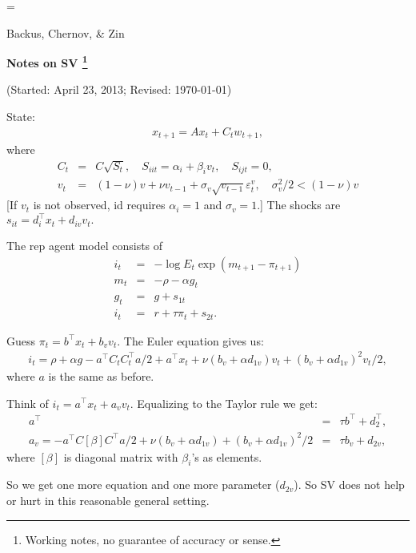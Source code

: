 \documentclass[11pt]{article}
\begin{document}
\parskip=\bigskipamount
\parindent=0.0in
\thispagestyle{empty}
\begin{flushright} Backus, Chernov, \& Zin \end{flushright}

\bigskip
\centerline{\Large \bf Notes on SV%
\footnote{Working notes, no guarantee of accuracy or sense.}}
\centerline{(Started: April 23, 2013; Revised: \today)}


State:
\begin{eqnarray*}
    x_{t+1} =  A  x_t + C_t w_{t+1} ,
    \label{eq:state-dynamics}
\end{eqnarray*}
where
\begin{eqnarray*}
   C_t &=& C \sqrt{S_t}, \quad S_{ii t} = \alpha_i+\beta_i v_t, \quad S_{ijt}=0, \\
       v_t &=& (1-\nu) v + \nu v_{t-1} + \sigma_v \sqrt{v_{t-1}} \varepsilon_t^v, \quad \sigma_v^2/2<(1-\nu)v
\end{eqnarray*}
[If $v_t$ is not observed, id requires $\alpha_i=1$ and $\sigma_v=1.$] The shocks are
$s_{it}=d_i^{\top}x_t+d_{iv}v_t.$

The rep agent model consists of
\begin{eqnarray*}
    i_t &=& %
            - \log E_t \exp(m_{t+1}-\pi_{t+1})
        \label{eq:macrofin-euler} \\
    m_t &=& - \rho - \alpha g_t \nonumber \\
    g_t &=& g + s_{1t}   \nonumber \\
    i_t &=& r + \tau \pi_t + s_{2t} .
        \label{eq:macrofin-taylor}
\end{eqnarray*}

Guess $\pi_t=b^{\top}x_t + b_v v_t.$ The Euler equation gives us:
\begin{eqnarray*}
    i_t = \rho + \alpha g - a^{\top} C_t C_t^{\top} a/2 + a^{\top} x_t + \nu (b_v+\alpha d_{1v}) v_t + (b_v+\alpha d_{1v})^2 v_t/2,
\end{eqnarray*}
where $a$ is the same as before.

Think of $i_t=a^{\top}x_t+a_v v_t.$ Equalizing to the Taylor rule we get:
\begin{eqnarray*}
     a^{\top}&=&\tau b^{\top} +d_2^{\top}, \\
     a_v=- a^{\top} C [\beta]C^{\top} a/2 + \nu (b_v+\alpha d_{1v}) + (b_v+\alpha d_{1v})^2 /2 &=& \tau b_v + d_{2v},
\end{eqnarray*}
where $ [\beta]$ is diagonal matrix with $\beta_i$'s as elements.

So we get one more equation and one more parameter ($d_{2v}$). So SV does not help or hurt in this reasonable general setting.
\end{document}

